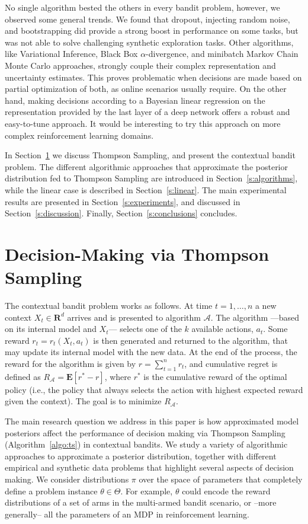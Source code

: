 \documentclass{article} \usepackage{iclr2018_conference,times}
\begin{document}
No single algorithm bested the others in every bandit problem, however, we observed some general trends. We found that dropout, injecting random noise, and bootstrapping did provide a strong boost in performance on some tasks, but was not able to solve challenging synthetic exploration tasks. Other algorithms, like Variational Inference, Black Box $\alpha$-divergence, and minibatch Markov Chain Monte Carlo approaches, strongly couple their complex representation and uncertainty estimates. This proves problematic when decisions are made based on partial optimization of both, as online scenarios usually require. On the other hand, making decisions according to a Bayesian linear regression on the representation provided by the last layer of a deep network offers a robust and easy-to-tune approach. It would be interesting to try this approach on more complex reinforcement learning domains.

In Section~\ref{s:problem} we discuss Thompson Sampling, and present the contextual bandit problem. The different algorithmic approaches that approximate the posterior distribution fed to Thompson Sampling are introduced in Section~\ref{s:algorithms}, while the linear case is described in Section~\ref{s:linear}. The main experimental results are presented in Section~\ref{s:experiments}, and discussed in Section~\ref{s:discussion}. Finally, Section~\ref{s:conclusions} concludes. \section{Decision-Making via Thompson Sampling}\label{s:problem}
The contextual bandit problem works as follows.  At time $t=1, \dots, n$ a new context $X_t \in \mathbf{R}^d$ arrives and is presented to algorithm $\mathcal{A}$.  The algorithm ---based on its internal model and $X_t$--- selects one of the $k$ available actions, $a_t$.  Some reward $r_t = r_t(X_t, a_t)$ is then generated and returned to the algorithm, that may update its internal model with the new data.
At the end of the process, the reward for the algorithm is given by $r = \sum_{t=1}^n r_t$, and cumulative regret is defined as $R_{\mathcal{A}} = \mathbf{E}[r^* - r]$, where $r^*$ is the cumulative reward of the optimal policy (i.e., the policy that always selects the action with highest expected reward given the context).
The goal is to minimize $R_{\mathcal{A}}$.

The main research question we address in this paper is how approximated model posteriors affect the performance of decision making via Thompson Sampling (Algorithm~\ref{algo:ts}) in contextual bandits.
We study a variety of algorithmic approaches to approximate a posterior distribution, together with different empirical and synthetic data problems that highlight several aspects of decision making.
We consider distributions $\pi$ over the space of parameters that completely define a problem instance $\theta \in \Theta$.
For example, $\theta$ could encode the reward distributions of a set of arms in the multi-armed bandit scenario, or --more generally-- all the parameters of an MDP in reinforcement learning.
\end{document}
